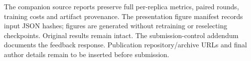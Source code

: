 \documentclass[10pt,a4paper,twocolumn]{article}
\begin{document}
The companion source reports preserve full per-replica metrics, paired rounds, training costs and artifact provenance. The presentation figure manifest records input JSON hashes; figures are generated without retraining or reselecting checkpoints. Original results remain intact. The submission-control addendum documents the feedback response. Publication repository/archive URLs and final author details remain to be inserted before submission.

\label{bodyend}
\clearpage


\end{document}
